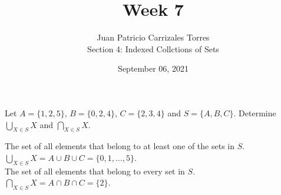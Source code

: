 \documentclass[12pt]{article}
\newenvironment{problem}[2][Problem]{\begin{trivlist}
		\item[\hskip \labelsep {\bfseries #1}\hskip \labelsep {\bfseries #2.}]}{\end{trivlist}}
\newenvironment{solution}[2][Solution]{\begin{trivlist}
		\item[\hskip \labelsep {\bfseries #1}\hskip \labelsep {\bfseries #2.}]}{\end{trivlist}}
\begin{document}
	
	\title{Week 7}
	\author{Juan Patricio Carrizales Torres \\
		Section 4: Indexed Collctions of Sets}
	\date{September 06, 2021}
	\maketitle
	
	\begin{problem}{37}
	Let $A=\{1,2,5\}$, $B=\{0,2,4\}$, $C=\{2,3,4\}$ and $S=\{A,B,C\}$. Determine $\bigcup_{X\in S}X$ and $\bigcap_{X\in S}X$.
	\begin{solution}{}
		The set of all elements that belong to at least one of the sets in $S$.\\
		$\bigcup_{X\in S}X = A\cup B\cup C=\{0,1,\ldots,5\}$. \\
		The set of all elements that belong to every set in $S$.\\
		$\bigcap_{X\in S}X = A\cap B\cap C= \{2\}$.
	\end{solution}
	\end{problem}
\end{document}
